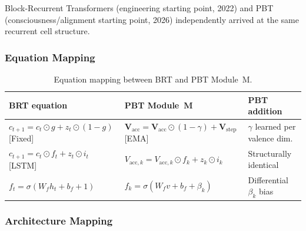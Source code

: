 \documentclass[12pt,a4paper]{article}
\newcommand{\Vacc}{\mathbf{V}_{\mathrm{acc}}}
\begin{document}
Block-Recurrent Transformers \citep{hutchins2022} (engineering starting point,
2022) and PBT (consciousness/alignment starting point, 2026) independently
arrived at the same recurrent cell structure.

\subsubsection{Equation Mapping}

\begin{table}[ht]
\centering
\caption{Equation mapping between BRT and PBT Module~M.}
\label{tab:brt_eq}
\small
\begin{tabular}{@{}L{4.5cm}L{4.5cm}L{3.5cm}@{}}
\toprule
\textbf{BRT equation} & \textbf{PBT Module~M} & \textbf{PBT addition} \\
\midrule
$c_{t+1} = c_t\odot g + z_t\odot(1-g)$ [Fixed] &
  $\Vacc = \Vacc\odot(1-\gamma) + \mathbf{V}_{\mathrm{step}}$ [EMA] &
  $\gamma$ learned per valence dim. \\[3pt]
$c_{t+1} = c_t\odot f_t + z_t\odot i_t$ [LSTM] &
  $V_{\mathrm{acc},k} = V_{\mathrm{acc},k}\odot f_k + z_k\odot i_k$ &
  Structurally identical \\[3pt]
$f_t = \sigma(W_f h_t + b_f + 1)$ &
  $f_k = \sigma(W_f v + b_f + \beta_k)$ &
  Differential $\beta_k$ bias \\
\bottomrule
\end{tabular}
\end{table}

\subsubsection{Architecture Mapping}
\end{document}
